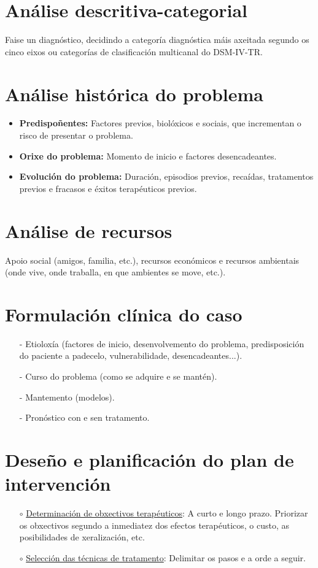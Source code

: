 \documentclass[a4paper,11pt]{article}
\begin{document}
\section{Análise descritiva-categorial}
Faise un diagnóstico, decidindo a categoría diagnóstica máis axeitada segundo os cinco eixos ou categorías de clasificación multicanal do DSM-IV-TR.

\section{Análise histórica do problema}
\begin{itemize}
	\item \textbf{Predispoñentes:} Factores previos, biolóxicos e sociais, que incrementan o risco de 
	presentar o problema.
	\item \textbf{Orixe do problema:} Momento de inicio e factores desencadeantes.
	\item \textbf{Evolución do problema:} Duración, episodios previos, recaídas, tratamentos previos 
	e fracasos e éxitos terapéuticos previos. 
\end{itemize}

\section{Análise de recursos}
Apoio social (amigos, familia, etc.), recursos económicos e recursos ambientais (onde vive, onde traballa, en que ambientes se move, etc.). 

\section{Formulación clínica do caso}
\begin{itemize}
	\item[-] Etioloxía (factores de inicio, desenvolvemento do problema, predisposición do paciente a 
	padecelo, vulnerabilidade, desencadeantes...).
	\item[-] Curso do problema (como se adquire e se mantén).
	\item[-] Mantemento (modelos).
	\item[-] Pronóstico con e sen tratamento.
\end{itemize}

\section{Deseño e planificación do plan de intervención}
\begin{itemize}
	\item[$\circ$] \underline{Determinación de obxectivos terapéuticos}: A curto e longo prazo. 
	Priorizar os obxectivos segundo a inmediatez dos efectos terapéuticos, o custo, as posibilidades 
	de xeralización, etc.
	\item[$\circ$] \underline{Selección das técnicas de tratamento}: Delimitar os pasos e a orde a 
	seguir.
\end{itemize}
\end{document}
